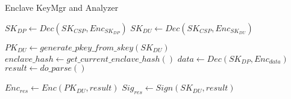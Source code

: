 \begin{algorithm}[h]
  \caption{Enclave KeyMgr and Analyzer}

  $SK_{DP} \leftarrow Dec(SK_{CSP},Enc_{SK_{DP}})$\;
  $SK_{DU} \leftarrow Dec(SK_{CSP},Enc_{SK_{DU}})$\;

  $PK_{DU} \leftarrow generate\_pkey\_from\_skey(SK_{DU})$\;
  $enclave\_hash \leftarrow get\_current\_enclave\_hash()$\;
  $data \leftarrow Dec(SK_{DP},Enc_{data})$\;
  $result \leftarrow do\_parse()$\;
  
  $Enc_{res} \leftarrow Enc(PK_{DU},result)$\;
  $Sig_{res} \leftarrow Sign(SK_{DU},result)$\;
  
  \;
\label{algo:analysis_enclave}
\end{algorithm}
